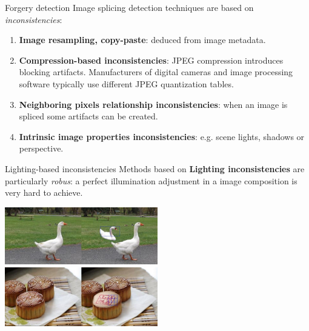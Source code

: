 \begin{tframe}{Forgery detection}
\vspace{0.2cm}
Image splicing detection techniques are based on \textit{inconsistencies}:
\vspace{0.3cm}
\begin{enumerate}
\item \textbf{Image resampling, copy-paste}: deduced from image metadata.
\vspace{0.3cm}

\item \textbf{Compression-based inconsistencies}: JPEG compression introduces blocking artifacts. Manufacturers of digital cameras and image processing software typically use different JPEG quantization tables.
\vspace{0.3cm}

\item  \textbf{Neighboring pixels relationship inconsistencies}: when an image is spliced some artifacts can be created.
\vspace{0.3cm}
\item \textbf{Intrinsic image properties inconsistencies}: e.g. scene lights, shadows or perspective.
\end{enumerate}

\end{tframe}


\begin{tframe}{Lighting-based inconsistencies}
\vspace{0.2cm}
Methods based on \textbf{Lighting inconsistencies} are particularly \emph{robus}: a perfect illumination adjustment in a image composition is very hard to achieve.
\vspace{0.3cm}
\begin{center}
\includegraphics[width=0.5\textwidth]{images/ducks.jpg}
\vspace{0.1cm}
\includegraphics[width=0.5\textwidth]{images/cakes.jpg}
\end{center}
\end{tframe}

